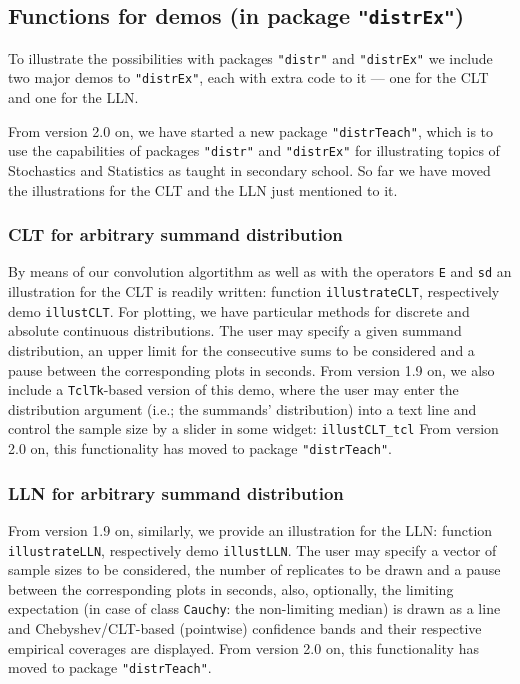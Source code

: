 \documentclass[11pt]{article}
\newcommand{\code}[1]{{\tt #1}}
\newcommand{\pkg}[1]{{\tt "#1"}}
\begin{document}
\subsection[Functions for demos (in package distrEx)]{Functions for demos
(in package \pkg{distrEx})}\label{Demos}
%
To illustrate the possibilities with packages \pkg{distr} and \pkg{distrEx} we
include two major demos to \pkg{distrEx}, each with extra code to it ---
one for the CLT and one for the LLN.

From version 2.0 on, we have started a new package \pkg{distrTeach}, which
is to use the capabilities of packages \pkg{distr} and \pkg{distrEx} for
illustrating topics of Stochastics and Statistics as taught in secondary
school. So far we have moved the illustrations for the CLT and the LLN
just mentioned to it.

\subsubsection{CLT for arbitrary summand distribution}

By means of our convolution algortithm as well as with the operators \code{E}
and \code{sd} an illustration for the CLT is readily written:
function \code{illustrateCLT}, respectively demo \code{illustCLT}.
For plotting, we have particular methods for discrete and absolute continuous
distributions. The user may specify a given summand distribution, an upper
limit for the consecutive sums to be considered and a pause between the
corresponding plots in seconds. From version 1.9 on, we also include a
\code{TclTk}-based version of this demo, where the user may enter the
distribution argument (i.e.; the summands' distribution) into a text line and
control the sample size by a slider in some widget: \code{illustCLT\_tcl}
From version 2.0 on, this functionality has moved to package \pkg{distrTeach}.

\subsubsection{LLN for arbitrary summand distribution}

From version 1.9 on, similarly, we provide an illustration for the LLN:
function \code{illustrateLLN}, respectively demo \code{illustLLN}.
The user may specify a vector of sample sizes to be
considered, the number of replicates to be drawn and a pause between the
corresponding plots in seconds, also, optionally, the limiting expectation
(in case of class \code{Cauchy}: the non-limiting median) is drawn as a line and
Chebyshev/CLT-based (pointwise) confidence bands and their respective empirical
coverages are displayed.
From version 2.0 on, this functionality has moved to package \pkg{distrTeach}.
\end{document}
